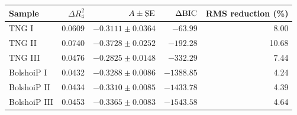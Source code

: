 \begin{tabular}{lrrrr}\toprule
Sample & $\Delta R^2_4$ & $A\pm{\rm SE}$ & $\Delta{\rm BIC}$ & RMS reduction (\%) \\\midrule
TNG I & 0.0609 & $-0.3111 \pm 0.0364$ & $-63.99$ & 8.00 \\
TNG II & 0.0740 & $-0.3728 \pm 0.0252$ & $-192.28$ & 10.68 \\
TNG III & 0.0476 & $-0.2825 \pm 0.0148$ & $-332.29$ & 7.44 \\
BolshoiP I & 0.0432 & $-0.3288 \pm 0.0086$ & $-1388.85$ & 4.24 \\
BolshoiP II & 0.0434 & $-0.3310 \pm 0.0085$ & $-1433.78$ & 4.39 \\
BolshoiP III & 0.0453 & $-0.3365 \pm 0.0083$ & $-1543.58$ & 4.64 \\
\bottomrule\end{tabular}
